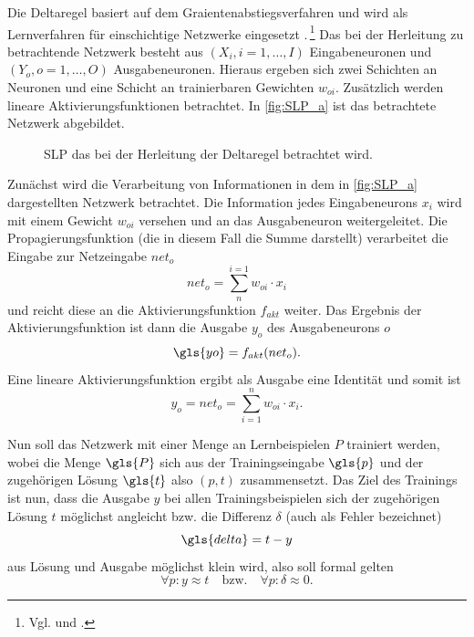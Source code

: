Die Deltaregel basiert auf dem Graientenabstiegsverfahren und wird als Lernverfahren für einschichtige Netzwerke eingesetzt .\,\footnote{Vgl. \citet[79 ff]{dkriesel07} und \citet[322 ff]{Rumelhart1986}.} Das bei der Herleitung zu betrachtende Netzwerk besteht aus $(X_{i}, i=1,\dots,I)$ Eingabeneuronen und $(Y_{o}, o=1,\dots,O)$ Ausgabeneuronen. Hieraus ergeben sich zwei Schichten an Neuronen und eine Schicht an trainierbaren Gewichten $w_{oi}$. Zusätzlich werden lineare Aktivierungsfunktionen betrachtet. In \autoref{fig:SLP_a} ist das betrachtete Netzwerk abgebildet.


\begin{figure}[!htb]
    \centering
        
    \caption{SLP das bei der Herleitung der Deltaregel betrachtet wird.}
    \label{fig:SLP_a}
\end{figure}

Zunächst wird die Verarbeitung von Informationen in dem in \autoref{fig:SLP_a} dargestellten Netzwerk betrachtet. Die Information jedes Eingabeneurons $x_i$ wird mit einem Gewicht $w_{oi}$ versehen und an das Ausgabeneuron weitergeleitet. Die Propagierungsfunktion (die in diesem Fall die Summe darstellt) verarbeitet die Eingabe zur Netzeingabe $net_o$
\begin{equation}
net_o= \sum^{i=1}_n w_{oi} \cdot x_i
\end{equation}
und reicht diese an die Aktivierungsfunktion $f_{akt}$ weiter. Das Ergebnis der Aktivierungsfunktion ist dann die Ausgabe $y_o$ des Ausgabeneurons $o$
\begin{equation}
\gls{yo}= f_{akt}(net_o).
\end{equation}
Eine lineare Aktivierungsfunktion ergibt als Ausgabe eine Identität und somit ist
\begin{equation}
y_o= net_o= \sum_{i=1}^n w_{oi} \cdot x_i.
\label{gl:ausgang}
\end{equation}

Nun soll das Netzwerk mit einer Menge an Lernbeispielen $P$ trainiert werden, wobei die Menge $\gls{P}$ sich aus der Trainingseingabe $\gls{p}$ und der zugehörigen Lösung $\gls{t}$ also $(p,t)$ zusammensetzt.
Das Ziel des Trainings ist nun, dass die Ausgabe $y$ bei allen Trainingsbeispielen sich der zugehörigen Lösung $t$ möglichst angleicht bzw. die Differenz $\delta$ (auch als Fehler bezeichnet) 
\begin{equation}
\gls{delta}=t-y
\label{gl:delta}
\end{equation}
%
aus Lösung und Ausgabe möglichst klein  wird, also soll formal gelten
\begin{equation*}
\forall p:y \approx t \quad \text{bzw.} \quad \forall p:\delta \approx 0.
\end{equation*}


